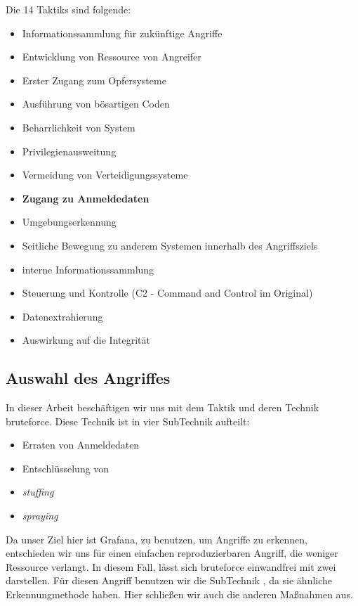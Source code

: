 {
Die 14 Taktiks sind folgende:
\begin{itemize}[noitemsep]
   \item Informationssammlung für zukünftige Angriffe 
   \item	Entwicklung von Ressource von Angreifer
   \item Erster Zugang zum Opfersysteme 
   \item Ausführung von bösartigen Coden
   \item Beharrlichkeit von System
   \item	Privilegienausweitung
   \item Vermeidung von Verteidigungssysteme
   \item \textbf{Zugang zu Anmeldedaten}
   \item Umgebungserkennung
   \item Seitliche Bewegung zu anderem Systemen innerhalb des Angriffsziels
   \item interne Informationssammlung
   \item Steuerung und Kontrolle (C2 - Command and Control im Original)
   \item Datenextrahierung 
   \item	Auswirkung auf die Integrität
\end{itemize}
}

\subsection{Auswahl des Angriffes}
In dieser Arbeit beschäftigen wir uns mit dem Taktik  und deren Technik \gls{bruteforce}. Diese Technik ist in vier SubTechnik aufteilt:

{
\begin{itemize}[noitemsep]
   \item Erraten von Anmeldedaten 
   \item	Entschlüsselung von 
   \item \textit{\gls{stuffing}}
   \item \textit{\gls{spraying}}
\end{itemize}
}

Da unser Ziel hier ist Grafana, zu benutzen, um Angriffe zu erkennen, entschieden wir uns für einen einfachen reproduzierbaren Angriff, die weniger Ressource verlangt. In diesem Fall, lässt sich \gls{bruteforce} einwandfrei mit zwei  darstellen. Für diesen Angriff benutzen wir die SubTechnik , da sie ähnliche Erkennungmethode haben. Hier schließen wir auch die anderen Maßnahmen aus.

